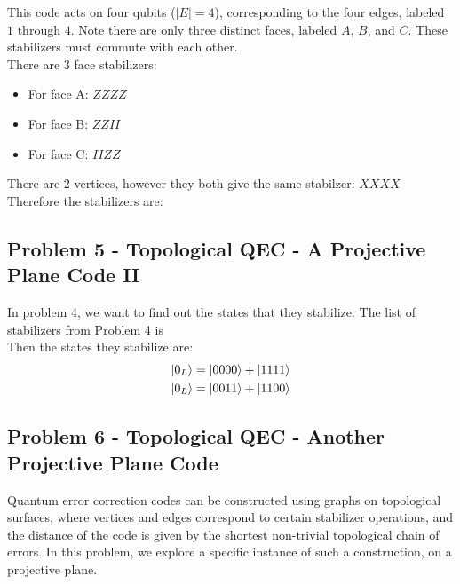 This code acts on four qubits ($|E| = 4$), corresponding to the four edges, labeled $1$ through $4$. Note there are only three distinct faces, labeled $A$, $B$, and $C$. These stabilizers must commute with each other.\\

There are 3 face stabilizers: \\
\begin{itemize}
    \item For face A: $ZZZZ$
    \item For face B: $ZZII$
    \item For face C: $IIZZ$
\end{itemize}
There are 2 vertices, however they both give the same stabilzer: $XXXX$ \\
Therefore the stabilizers are:
\begin{equation}
    [ZZZZ,ZZII,IIZZ,XXXX]
\end{equation}



\newpage
\subsection{Problem 5 - Topological QEC - A Projective Plane Code II}
In problem 4, we want to find out the states that they stabilize. The list of stabilizers from Problem 4 is 
\begin{equation}
    [ZZZZ,ZZII,IIZZ,XXXX]
\end{equation}
Then the states they stabilize are:
\begin{align}
    \ket{0_L} = \ket{0000} + \ket{1111} \\
    \ket{0_L} = \ket{0011} + \ket{1100} 
\end{align}


\newpage
\subsection{Problem 6 - Topological QEC - Another Projective Plane Code}
Quantum error correction codes can be constructed using graphs on topological surfaces, where vertices and edges correspond to certain stabilizer operations, and the distance of the code is given by the shortest non-trivial topological chain of errors. In this problem, we explore a specific instance of such a construction, on a projective plane.\\

